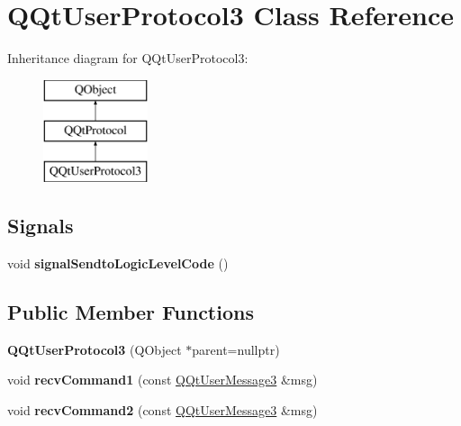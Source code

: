 \hypertarget{class_q_qt_user_protocol3}{}\section{Q\+Qt\+User\+Protocol3 Class Reference}
\label{class_q_qt_user_protocol3}
Inheritance diagram for Q\+Qt\+User\+Protocol3\+:\begin{figure}[H]
\begin{center}
\leavevmode
\includegraphics[height=3.000000cm]{class_q_qt_user_protocol3}
\end{center}
\end{figure}
\subsection*{Signals}
\begin{DoxyCompactItemize}
\item 
\mbox{\label{class_q_qt_user_protocol3_a24a143233cf752be74d87fd24719420a}} 
void {\bfseries signal\+Sendto\+Logic\+Level\+Code} ()
\end{DoxyCompactItemize}
\subsection*{Public Member Functions}
\begin{DoxyCompactItemize}
\item 
\mbox{\label{class_q_qt_user_protocol3_ade552a1640a95ed70b5a404f85368a95}} 
{\bfseries Q\+Qt\+User\+Protocol3} (Q\+Object $\ast$parent=nullptr)
\item 
\mbox{\label{class_q_qt_user_protocol3_abbbcac681725543b374cd71cb40168a5}} 
void {\bfseries recv\+Command1} (const \mbox{\hyperlink{class_q_qt_user_message3}{Q\+Qt\+User\+Message3}} \&msg)
\item 
\mbox{\label{class_q_qt_user_protocol3_a772a3323cf140c945f55a74dd5204d19}} 
void {\bfseries recv\+Command2} (const \mbox{\hyperlink{class_q_qt_user_message3}{Q\+Qt\+User\+Message3}} \&msg)
\end{DoxyCompactItemize}
